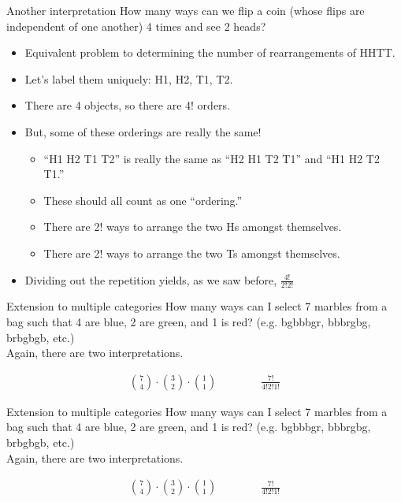 \documentclass[aspectratio=169]{../latex_main/tntbeamer}  %
\begin{document}
	\begin{frame}{Another interpretation}
	    How many ways can we flip a coin (whose flips are independent of one another) 4 times and see 2 heads?
        \begin{itemize}
            \item Equivalent problem to determining the number of rearrangements of HHTT.
            \item Let’s label them uniquely: H1, H2, T1, T2.
            \item There are 4 objects, so there are 4! orders.
            \item But, some of these orderings are really the same!
            \begin{itemize}
                \item “H1 H2 T1 T2” is really the same as “H2 H1 T2 T1” and “H1 H2 T2 T1.”
                \item These should all count as one “ordering.”
                \item There are 2! ways to arrange the two Hs amongst themselves.
                \item There are 2! ways to arrange the two Ts amongst themselves.
            \end{itemize}
            \item Dividing out the repetition yields, as we saw before, $\frac{4!}{2!2!}$
        \end{itemize}

	\end{frame}
	
	\begin{frame}{Extension to multiple categories}
	    How many ways can I select 7 marbles from a bag such that 4 are blue, 2 are green, and 1 is red? (e.g. bgbbbgr, bbbrgbg, brbgbgb, etc.)\\
	    \bigskip
	    Again, there are two interpretations.

        \begin{align*}
            \binom{7}{4}\cdot \binom{3}{2} \cdot \binom{1}{1} \qquad \qquad \frac{7!}{4!2!1!}
        \end{align*}

	\end{frame}
	
	
	\begin{frame}{Extension to multiple categories}
	    How many ways can I select 7 marbles from a bag such that 4 are blue, 2 are green, and 1 is red? (e.g. bgbbbgr, bbbrgbg, brbgbgb, etc.)\\
	    \bigskip
	    Again, there are two interpretations.

        \begin{align*}
            \binom{7}{4}\cdot \binom{3}{2} \cdot \binom{1}{1} \qquad \qquad \frac{7!}{4!2!1!}
        \end{align*}

	\end{frame}
	
\end{document}
